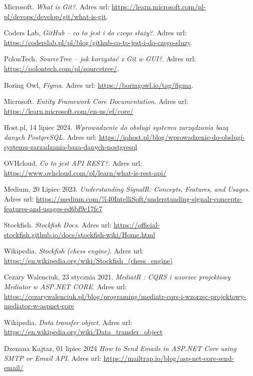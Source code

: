 \documentclass[twoside]{projektInzynierskiMS1}
\begin{document}
\begin{thebibliography}{99}
    Microsoft. \textit{What is Git?}. Adres url: \url{https://learn.microsoft.com/pl-pl/devops/develop/git/what-is-git}.

    Coders Lab, \textit{GitHub – co to jest i do czego służy?}. Adres url: \url{https://coderslab.pl/pl/blog/github-co-to-jest-i-do-czego-sluzy}.

    PolonTech. \textit{SourceTree – jak korzystać z Git w GUI?}. Adres url: \url{https://polontech.com/pl/sourcetree/}.

    Boring Owl, \textit{Figma}. Adres url: \url{https://boringowl.io/tag/figma}.

    Microsoft. \textit{Entity Framework Core Documentation}. Adres url:  \url{https://learn.microsoft.com/en-us/ef/core/}
    
    Host.pl, 14 lipiec 2024. \textit{Wprowadzenie do obsługi systemu zarządzania bazą danych PostgreSQL}. Adres url:  \url{https://iqhost.pl/blog/wprowadzenie-do-obslugi-systemu-zarzadzania-baza-danych-postgresql}

    OVHcloud. \textit{Co to jest API REST?}. Adres url:  \url{https://www.ovhcloud.com/pl/learn/what-is-rest-api/}

    Medium, 20 Lipiec 2023. \textit{Understanding SignalR: Concepts, Features, and Usages}. Adres url:  \url{https://medium.com/%40IntelliSoft/understanding-signalr-concepts-features-and-usages-ed6bf9c17fc7}

    Stockfish. \textit{Stockfish Docs}. Adres url:  \url{https://official-stockfish.github.io/docs/stockfish-wiki/Home.html}

    Wikipedia. \textit{Stockfish (chess engine)}. Adres url: \url{https://en.wikipedia.org/wiki/Stockfish_(chess_engine)}

    Cezary Walenciuk, 23 stycznia 2021. \textit{MediatR : CQRS i wzorzec projektowy Mediator w ASP.NET CORE}. Adres url: \url{https://cezarywalenciuk.pl/blog/programing/mediatr-cqrs-i-wzorzec-projektowy-mediator-w-aspnet-core}

    Wikipedia. \textit{Data transfer object}. Adres url: \url{https://en.wikipedia.org/wiki/Data_transfer_object}

    Dzenana Kajtaz, 01 lipiec 2024 \textit{How to Send Emails in ASP.NET Core using SMTP or Email API}. Adres url: \url{https://mailtrap.io/blog/asp-net-core-send-email/}


\end{thebibliography}
\end{document}
